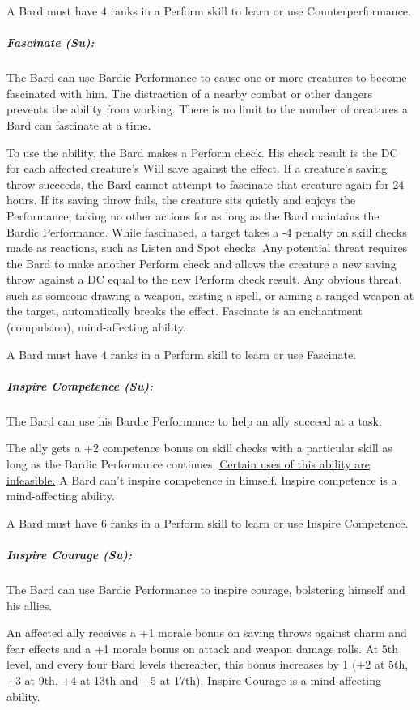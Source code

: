 A Bard must have 4 ranks in a Perform skill to learn or use Counterperformance.
\subparagraph{Fascinate (Su):}
The Bard can use Bardic Performance to cause one or more creatures to become fascinated with him. %
The distraction of a nearby combat or other dangers prevents the ability from working. There is no limit to the number of creatures a Bard can fascinate at a time.

To use the ability, the Bard makes a Perform check. His check result is the DC for each affected creature's Will save against the effect. If a creature's saving throw succeeds, the Bard cannot attempt to fascinate that creature again for 24 hours. If its saving throw fails, the creature sits quietly and enjoys the Performance, taking no other actions for as long as the Bard maintains the Bardic Performance. While fascinated, a target takes a -4 penalty on skill checks made as reactions, such as Listen and Spot checks. Any potential threat requires the Bard to make another Perform check and allows the creature a new saving throw against a DC equal to the new Perform check result. Any obvious threat, such as someone drawing a weapon, casting a spell, or aiming a ranged weapon at the target, automatically breaks the effect. 
Fascinate is an enchantment (compulsion), mind-affecting ability.

A Bard must have 4 ranks in a Perform skill to learn or use Fascinate.
\subparagraph{Inspire Competence (Su):}
The Bard can use his Bardic Performance to help an ally succeed at a task. 

The ally gets a +2 competence bonus on skill checks with a particular skill as long as the Bardic Performance continues. \href{http://www.giantitp.com/comics/oots0004.html}{Certain uses of this ability are infeasible.} A Bard can't inspire competence in himself. Inspire competence is a mind-affecting ability.

A Bard must have 6 ranks in a Perform skill to learn or use Inspire Competence.
\subparagraph{Inspire Courage (Su):}
The Bard can use Bardic Performance to inspire courage, bolstering himself and his allies.

An affected ally receives a +1 morale bonus on saving throws against charm and fear effects and a +1 morale bonus on attack and weapon damage rolls. At 5th level, and every four Bard levels thereafter, this bonus increases by 1 (+2 at 5th, +3 at 9th, +4 at 13th and +5 at 17th). Inspire Courage is a mind-affecting ability.

